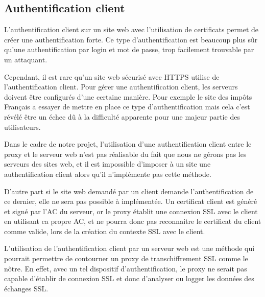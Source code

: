 \subsection{Authentification client}

L'authentification client sur un site web avec l'utilisation de certificats permet de créer une authentification forte.
Ce type d'authentification est beaucoup plus sûr qu'une authentification par 
login et mot de passe, trop facilement trouvable par un attaquant.

Cependant, il est rare qu'un site web sécurisé avec HTTPS utilise de l'authentification 
client. Pour gérer une authentification client, les serveurs doivent être configurés d'une certaine manière. 
Pour exemple le site des impôts Français a essayer de mettre en place ce 
type d'authentification mais cela c'est révélé être un échec dû à la difficulté 
apparente pour une majeur partie des utilisateurs.

Dans le cadre de notre projet, l'utilisation d'une authentification client entre le proxy et le serveur web n'est 
pas réalisable du fait que nous ne gérons pas les serveurs des sites web, et il 
est impossible d'imposer à un site une authentification client alors qu'il 
n'implémente pas cette méthode.

D'autre part si le site web demandé par un client demande l'authentification de 
ce dernier, elle ne sera pas possible à implémentée. Un certificat client est 
généré et signé par l'AC du serveur, or le proxy établit une connexion SSL avec 
le client en utilisant ca propre AC, et ne pourra donc pas reconnaitre le 
certificat du client comme valide, lors de la création du contexte SSL avec le client. 

L'utilisation de l'authentification client par un serveur web est une méthode qui pourrait permettre de contourner
un proxy de transchiffrement SSL comme le nôtre. En effet, avec un tel dispositif d'authentification, le proxy
ne serait pas capable d'établir de connexion SSL et donc d'analyser ou logger les données des échanges SSL.